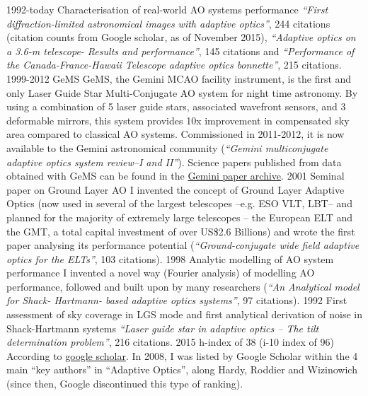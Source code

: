 \documentclass[]{friggeri-cv}
\begin{document}
\begin{entrylist}
  \entry
    {1992-today}
    {Characterisation of real-world AO systems performance}
    {}
    {{\em ``First diffraction-limited astronomical images with adaptive optics''},
    244 citations (citation counts from Google scholar, as of November 2015), {\em ``Adaptive optics on a 3.6-m telescope- Results and
    performance''}, 145 citations and {\em ``Performance of the Canada-France-Hawaii
    Telescope adaptive optics bonnette''}, 215 citations.}
  \entry
    {1999-2012}
    {GeMS}
    {}
    {GeMS, the Gemini MCAO facility instrument, is the first and only Laser Guide Star Multi-Conjugate AO system for night time astronomy. By using a combination of 5 laser guide stars, associated wavefront sensors, and 3 deformable mirrors, this system provides 10x improvement in compensated sky area compared to classical AO systems. Commissioned in 2011-2012, it is now available to the Gemini astronomical community ({\em ``Gemini multiconjugate adaptive optics system review–I and II''}). Science papers published from data obtained with GeMS can be found in the \href{http://www.gemini.edu/apps/publications-users/?Publication[instrument]=GeMS}{Gemini paper archive}.}
  \entry
    {2001}
    {Seminal paper on Ground Layer AO}
    {}
    {I invented the concept of Ground Layer Adaptive Optics (now used in several of the largest telescopes --e.g. ESO VLT, LBT-- and planned for the majority of extremely large telescopes -- the European ELT and the GMT, a total capital investment of over US\$2.6 Billions) and wrote the first paper analysing its performance potential ({\em ``Ground-conjugate wide field adaptive optics for the ELTs''}, 103 citations).}
  \entry
    {1998}
    {Analytic modelling of AO system performance}
    {}
    {I invented a novel way (Fourier analysis) of modelling AO performance, followed and built upon by many researchers ({\em ``An Analytical model for Shack- Hartmann- based adaptive optics systems''}, 97 citations).}
  \entry
    {1992}
    {First assessment of sky coverage in LGS mode and first analytical derivation of noise in Shack-Hartmann systems}
    {}
    {{\em ``Laser guide star in adaptive optics -- The tilt determination problem''}, 216 citations.}
  \entry
    {2015}
    {h-index of 38 (i-10 index of 96)}
    {}
    {According to
    \href{http://scholar.google.com/citations?hl=en\&user=SD\_leV4AAAAJ}{google scholar}. In 2008, I was listed by Google Scholar within the 4 main ``key authors'' in ``Adaptive Optics'', along Hardy, Roddier and Wizinowich (since then, Google discontinued this type of ranking).}
  \end{entrylist}
\end{document}
